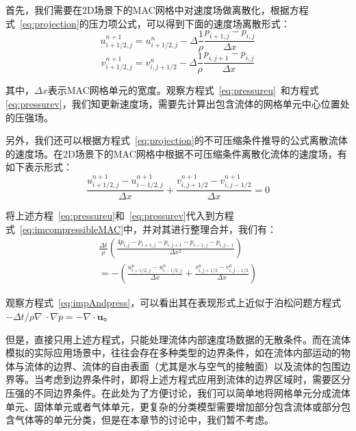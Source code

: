 首先，我们需要在2D场景下的MAC网格中对速度场做离散化，根据方程式~\ref{eq:projection}的压力项公式，可以得到下面的速度场离散形式：
\begin{equation}
\label{eq:pressureu}
u_{i + 1 / 2, j}^{n + 1} = u_{i + 1 / 2, j}^n - \Delta \frac{1}{\rho} \frac{p_{i + 1, j} - p_{i, j}}{\Delta x}
\end{equation}
\begin{equation}
\label{eq:pressurev}
v_{i + 1 / 2, j}^{n + 1} = v_{i, j +1 / 2}^n - \Delta \frac{1}{\rho} \frac{p_{i, j + 1} - p_{i, j}}{\Delta x}
\end{equation}

其中，$\Delta x$表示MAC网格单元的宽度。观察方程式~\ref{eq:pressureu}~和方程式\ref{eq:pressurev}，我们知更新速度场，需要先计算出包含流体的网格单元中心位置处的压强场。

另外，我们还可以根据方程式~\ref{eq:projection}的不可压缩条件推导的公式离散流体的速度场。在2D场景下的MAC网格中根据不可压缩条件离散化流体的速度场，有如下表示形式：
\begin{equation}
\label{eq:imcompressibleMAC}
\frac{u_{i + 1 / 2, j}^{n + 1} - u_{i - 1 / 2, j}^{n + 1}}{\Delta x} + 
\frac{v_{i, j + 1 / 2}^{n + 1} - v_{i, j - 1 / 2}^{n + 1}}{\Delta x}
= 0
\end{equation}

将上述方程~\ref{eq:pressureu}和~\ref{eq:pressurev}代入到方程式~\ref{eq:imcompressibleMAC}中，并对其进行整理合并，我们有：
\begin{multline}
\label{eq:impAndpress}
\frac{\Delta t}{\rho} (\frac{4p_{i,j} - p_{i + 1,j} - p_{i, j + 1} - p_{i - 1, j} - p_{i,j - 1}}{\Delta x^2}) \\
= - (\frac{u_{i + 1 / 2, j}^n - u_{i - 1 / 2, j}^n}{\Delta x} +
 \frac{v_{i, j + 1 / 2}^n - v_{i, j - 1/2}^n}{\Delta x})
\end{multline}

观察方程式~\ref{eq:impAndpress}，可以看出其在表现形式上近似于泊松问题方程式$-\Delta t / \rho \nabla\ \cdot \nabla p = - \nabla \cdot \boldsymbol u$。

但是，直接只用上述方程式，只能处理流体内部速度场数据的无散条件。而在流体模拟的实际应用场景中，往往会存在多种类型的边界条件，如在流体内部运动的物体与流体的边界、流体的自由表面（尤其是水与空气的接触面）以及流体的包围边界等。当考虑到边界条件时，即将上述方程式应用到流体的边界区域时，需要区分压强的不同边界条件。在此处为了方便讨论，我们可以简单地将网格单元分成流体单元、固体单元或者气体单元，更复杂的分类模型需要增加部分包含流体或部分包含气体等的单元分类，但是在本章节的讨论中，我们暂不考虑。

